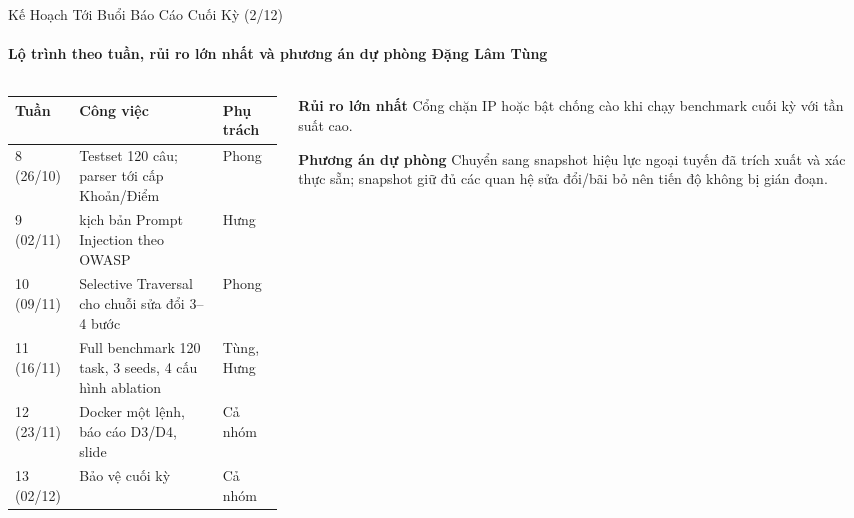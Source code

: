 \documentclass[aspectratio=1610,10pt,xcolor={table}]{beamer}
\begin{document}
\begin{frame}{Kế Hoạch Tới Buổi Báo Cáo Cuối Kỳ (2/12)}
  \framesubtitle{Lộ trình theo tuần, rủi ro lớn nhất và phương án dự phòng \hfill Đặng Lâm Tùng}

  \begin{columns}[t]
    \begin{column}{0.6\textwidth}
      \footnotesize
      \begin{tabularx}{\linewidth}{@{}l >{\raggedright\arraybackslash}X >{\raggedright\arraybackslash}p{1.5cm}@{}}
        \toprule
        \textbf{Tuần} & \textbf{Công việc} & \textbf{Phụ trách} \\
        \midrule
        8 (26/10) & Testset 120 câu; parser tới cấp Khoản/Điểm & Phong \\
        9 (02/11) & 10 kịch bản Prompt Injection theo OWASP & Hưng \\
        10 (09/11) & Selective Traversal cho chuỗi sửa đổi 3--4 bước & Phong \\
        11 (16/11) & Full benchmark 120 task, 3 seeds, 4 cấu hình ablation & Tùng, Hưng \\
        12 (23/11) & Docker một lệnh, báo cáo D3/D4, slide & Cả nhóm \\
        13 (02/12) & Bảo vệ cuối kỳ & Cả nhóm \\
        \bottomrule
      \end{tabularx}
    \end{column}

    \begin{column}{0.38\textwidth}
      \begin{block}{\textbf{Rủi ro lớn nhất}}
        \footnotesize Cổng  chặn IP hoặc bật chống cào khi chạy benchmark cuối kỳ với tần suất cao.
      \end{block}
      \begin{block}{\textbf{Phương án dự phòng}}
        \footnotesize Chuyển sang snapshot hiệu lực ngoại tuyến đã trích xuất và xác thực sẵn; snapshot giữ đủ các quan hệ sửa đổi/bãi bỏ nên tiến độ không bị gián đoạn.
      \end{block}
    \end{column}
  \end{columns}
\end{frame}
\end{document}
